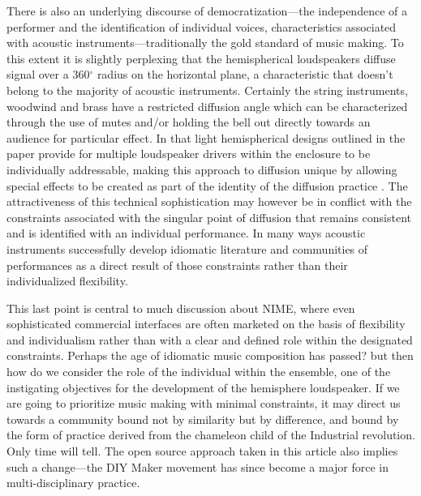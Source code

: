 There is also an underlying discourse of democratization---the independence of a performer and the identification of individual voices, characteristics associated with acoustic instruments---traditionally the gold standard of music making. To this extent it is slightly perplexing that the hemispherical loudspeakers diffuse signal over a 360$^{\circ}$ radius on the horizontal plane, a characteristic that doesn't belong to the majority of acoustic instruments. Certainly the string instruments, woodwind and brass have a restricted diffusion angle which can be characterized through the use of mutes and/or holding the bell out directly towards an audience for particular effect. In that light hemispherical designs outlined in the paper provide for multiple loudspeaker drivers within the enclosure to be individually addressable, making this approach to diffusion unique by allowing special effects to be created as part of the identity of the diffusion practice \cite{Trueman:2000}. The attractiveness of this technical sophistication may however be in conflict with the constraints associated with the singular point of diffusion that remains consistent and is identified with an individual performance. In many ways acoustic instruments successfully develop idiomatic literature and communities of performances as a direct result of those  constraints rather than their individualized flexibility.

This last point is central to much discussion about NIME, where even sophisticated commercial interfaces are often marketed on the basis of flexibility and individualism rather than with a clear and defined role within the designated constraints. Perhaps the age of idiomatic music composition has passed? but then how do we consider the role of the individual within the ensemble, one of the instigating objectives for the development of the hemisphere loudspeaker. If we are going to prioritize music making with minimal constraints, it may direct us towards a community bound not by similarity but by difference, and bound by the form of practice derived from the chameleon child of the Industrial revolution. Only time will tell. The open source approach taken in this article also implies such a change---the DIY Maker movement has since become a major force in multi-disciplinary practice.

